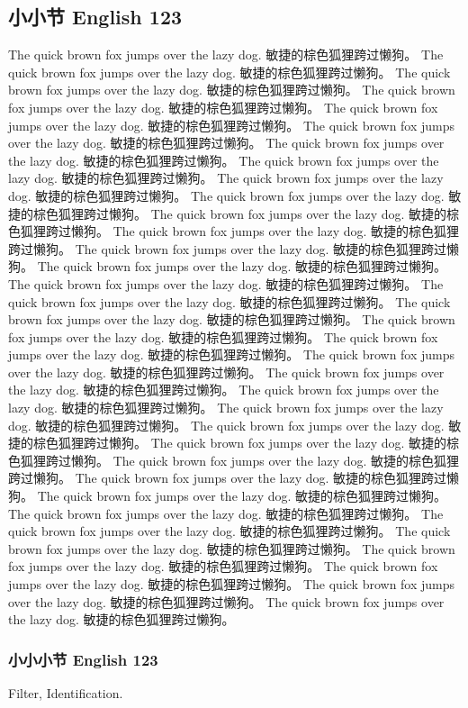 \subsection{小小节 English 123}
\label{sec:funda:1:1}

The quick brown fox jumps over the lazy dog. 敏捷的棕色狐狸跨过懒狗。
The quick brown fox jumps over the lazy dog. 敏捷的棕色狐狸跨过懒狗。
The quick brown fox jumps over the lazy dog. 敏捷的棕色狐狸跨过懒狗。
The quick brown fox jumps over the lazy dog. 敏捷的棕色狐狸跨过懒狗。
The quick brown fox jumps over the lazy dog. 敏捷的棕色狐狸跨过懒狗。
The quick brown fox jumps over the lazy dog. 敏捷的棕色狐狸跨过懒狗。
The quick brown fox jumps over the lazy dog. 敏捷的棕色狐狸跨过懒狗。
The quick brown fox jumps over the lazy dog. 敏捷的棕色狐狸跨过懒狗。
The quick brown fox jumps over the lazy dog. 敏捷的棕色狐狸跨过懒狗。
The quick brown fox jumps over the lazy dog. 敏捷的棕色狐狸跨过懒狗。
The quick brown fox jumps over the lazy dog. 敏捷的棕色狐狸跨过懒狗。
The quick brown fox jumps over the lazy dog. 敏捷的棕色狐狸跨过懒狗。
The quick brown fox jumps over the lazy dog. 敏捷的棕色狐狸跨过懒狗。
The quick brown fox jumps over the lazy dog. 敏捷的棕色狐狸跨过懒狗。
The quick brown fox jumps over the lazy dog. 敏捷的棕色狐狸跨过懒狗。
The quick brown fox jumps over the lazy dog. 敏捷的棕色狐狸跨过懒狗。
The quick brown fox jumps over the lazy dog. 敏捷的棕色狐狸跨过懒狗。
The quick brown fox jumps over the lazy dog. 敏捷的棕色狐狸跨过懒狗。
The quick brown fox jumps over the lazy dog. 敏捷的棕色狐狸跨过懒狗。
The quick brown fox jumps over the lazy dog. 敏捷的棕色狐狸跨过懒狗。
The quick brown fox jumps over the lazy dog. 敏捷的棕色狐狸跨过懒狗。
The quick brown fox jumps over the lazy dog. 敏捷的棕色狐狸跨过懒狗。
The quick brown fox jumps over the lazy dog. 敏捷的棕色狐狸跨过懒狗。
The quick brown fox jumps over the lazy dog. 敏捷的棕色狐狸跨过懒狗。
The quick brown fox jumps over the lazy dog. 敏捷的棕色狐狸跨过懒狗。
The quick brown fox jumps over the lazy dog. 敏捷的棕色狐狸跨过懒狗。
The quick brown fox jumps over the lazy dog. 敏捷的棕色狐狸跨过懒狗。
The quick brown fox jumps over the lazy dog. 敏捷的棕色狐狸跨过懒狗。
The quick brown fox jumps over the lazy dog. 敏捷的棕色狐狸跨过懒狗。
The quick brown fox jumps over the lazy dog. 敏捷的棕色狐狸跨过懒狗。
The quick brown fox jumps over the lazy dog. 敏捷的棕色狐狸跨过懒狗。
The quick brown fox jumps over the lazy dog. 敏捷的棕色狐狸跨过懒狗。
The quick brown fox jumps over the lazy dog. 敏捷的棕色狐狸跨过懒狗。
The quick brown fox jumps over the lazy dog. 敏捷的棕色狐狸跨过懒狗。
The quick brown fox jumps over the lazy dog. 敏捷的棕色狐狸跨过懒狗。

\subsubsection{小小小节 English 123}
\label{sec:funda:1:1:1}

Filter, Identification.